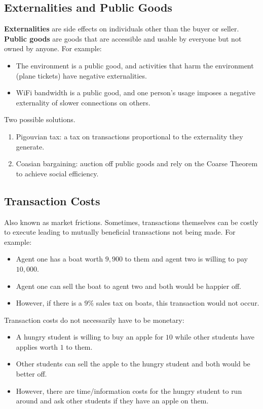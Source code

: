 \documentclass[dvipsnames]{article}
\theoremstyle{definition}
\theoremstyle{remark}
\begin{document}
\subsection{Externalities and Public Goods}
\textbf{Externalities} are side effects on individuals other than the buyer or seller. \textbf{Public goods} are goods that are accessible and usable by everyone but not owned by anyone. For example:
\begin{itemize}
	\item The environment is a public good, and activities that harm the environment (plane tickets) have negative externalities.
	\item WiFi bandwidth is a public good, and one person's usage imposes a negative externality of slower connections on others. 
\end{itemize}
Two possible solutions.
\begin{enumerate}
	\item Pigouvian tax: a tax on transactions proportional to the externality they generate.
	\item Coasian bargaining: auction off public goods and rely on the Coarse Theorem to achieve social efficiency. 
\end{enumerate}

\subsection{Transaction Costs}
Also known as market frictions. Sometimes, transactions themselves can be costly to execute leading to mutually beneficial transactions not being made. For example:
\begin{itemize}
	\item Agent one has a boat worth $9,900$ to them and agent two is willing to pay $10,000$.
	\item Agent one can sell the boat to agent two and both would be happier off. 
	\item However, if there is a $9\%$ sales tax on boats, this transaction would not occur. 
\end{itemize}
Transaction costs do not necessarily have to be monetary:
\begin{itemize}
	\item A hungry student is willing to buy an apple for $10$ while other students have applies worth $1$ to them. 
	\item Other students can sell the apple to the hungry student and both would be better off.
	\item However, there are time/information costs for the hungry student to run around and ask other students if they have an apple on them.
\end{itemize}
\end{document}
